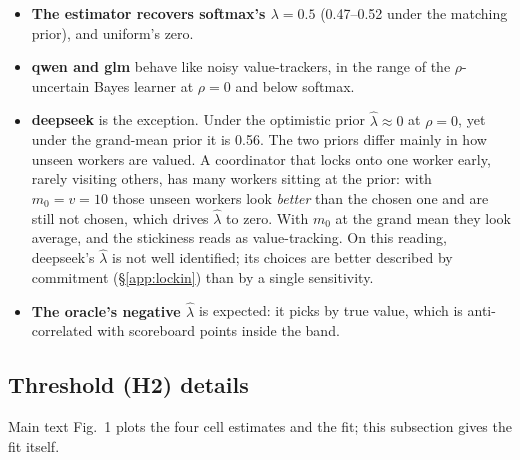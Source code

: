 \documentclass[11pt,letterpaper]{article}
\numberwithin{equation}{section}
\numberwithin{table}{section}
\numberwithin{figure}{section}
\numberwithin{algorithm}{section}
\begin{document}
\begin{itemize}
  \item \textbf{The estimator recovers softmax's $\lambda=0.5$} (0.47--0.52 under the matching prior), and uniform's zero.
  \item \textbf{qwen and glm} behave like noisy value-trackers, in the range of the $\rho$-uncertain Bayes learner at $\rho=0$ and below softmax.
  \item \textbf{deepseek} is the exception. Under the optimistic prior $\hat\lambda\approx0$ at $\rho=0$, yet under the grand-mean prior it is 0.56. The two priors differ mainly in how unseen workers are valued. A coordinator that locks onto one worker early, rarely visiting others, has many workers sitting at the prior: with $m_0=v=10$ those unseen workers look \emph{better} than the chosen one and are still not chosen, which drives $\hat\lambda$ to zero. With $m_0$ at the grand mean they look average, and the stickiness reads as value-tracking. On this reading, deepseek's $\hat\lambda$ is not well identified; its choices are better described by commitment (\S\ref{app:lockin}) than by a single sensitivity.
  \item \textbf{The oracle's negative $\hat\lambda$} is expected: it picks by true value, which is anti-correlated with scoreboard points inside the band.
\end{itemize}

\subsection{Threshold (H2) details}

Main text Fig.~1 plots the four cell estimates and the fit; this subsection gives the fit itself.
\end{document}
